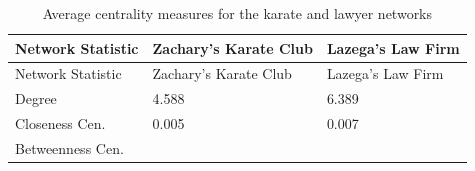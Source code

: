 \documentclass[12pt,twoside]{amherstthesis}
\begin{document}
  \begin{longtable}[]{@{}lll@{}}
  \caption{Average centrality measures for the karate and lawyer networks
  \label{tab:avgcent}}\tabularnewline
  \toprule
  \begin{minipage}[b]{0.27\columnwidth}\raggedright\strut
  Network Statistic\strut
  \end{minipage} & \begin{minipage}[b]{0.29\columnwidth}\raggedright\strut
  Zachary's Karate Club\strut
  \end{minipage} & \begin{minipage}[b]{0.23\columnwidth}\raggedright\strut
  Lazega's Law Firm\strut
  \end{minipage}\tabularnewline
  \midrule
  \endfirsthead
  \toprule
  \begin{minipage}[b]{0.27\columnwidth}\raggedright\strut
  Network Statistic\strut
  \end{minipage} & \begin{minipage}[b]{0.29\columnwidth}\raggedright\strut
  Zachary's Karate Club\strut
  \end{minipage} & \begin{minipage}[b]{0.23\columnwidth}\raggedright\strut
  Lazega's Law Firm\strut
  \end{minipage}\tabularnewline
  \midrule
  \endhead
  \begin{minipage}[t]{0.27\columnwidth}\raggedright\strut
  Degree\strut
  \end{minipage} & \begin{minipage}[t]{0.29\columnwidth}\raggedright\strut
  4.588\strut
  \end{minipage} & \begin{minipage}[t]{0.23\columnwidth}\raggedright\strut
  6.389\strut
  \end{minipage}\tabularnewline
  \begin{minipage}[t]{0.27\columnwidth}\raggedright\strut
  Closeness Cen.\strut
  \end{minipage} & \begin{minipage}[t]{0.29\columnwidth}\raggedright\strut
  0.005\strut
  \end{minipage} & \begin{minipage}[t]{0.23\columnwidth}\raggedright\strut
  0.007\strut
  \end{minipage}\tabularnewline
  \begin{minipage}[t]{0.27\columnwidth}\raggedright\strut
  Betweenness Cen.\strut
  \end{minipage} & \begin{minipage}[t]{0.29\columnwidth}\raggedright\strut

\end{minipage}
\end{longtable}
\end{document}

